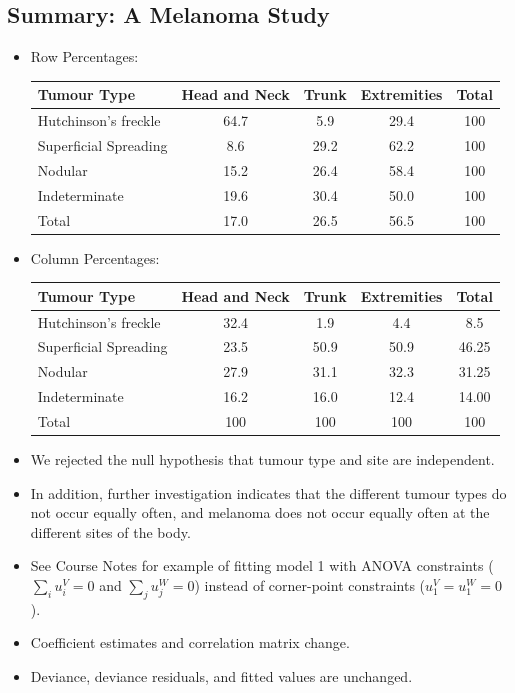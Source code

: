 \documentclass{article}\usepackage[]{graphicx}\usepackage[svgnames]{xcolor}
\begin{document}
\subsection*{Summary: A Melanoma Study}
\begin{itemize}
    \item Row Percentages:
          \begin{table}[H]
              \centering
              \begin{tabular}{lcccc}
                  Tumour Type           & Head and Neck & Trunk & Extremities & Total \\
                  \midrule
                  Hutchinson's freckle  & 64.7          & 5.9   & 29.4        & 100   \\
                  Superficial Spreading & 8.6           & 29.2  & 62.2        & 100   \\
                  Nodular               & 15.2          & 26.4  & 58.4        & 100   \\
                  Indeterminate         & 19.6          & 30.4  & 50.0        & 100   \\
                  Total                 & 17.0          & 26.5  & 56.5        & 100
              \end{tabular}
          \end{table}
    \item Column Percentages:
          \begin{table}[H]
              \centering
              \begin{tabular}{lcccc}
                  Tumour Type           & Head and Neck & Trunk & Extremities & Total \\
                  \midrule
                  Hutchinson's freckle  & 32.4          & 1.9   & 4.4         & 8.5   \\
                  Superficial Spreading & 23.5          & 50.9  & 50.9        & 46.25 \\
                  Nodular               & 27.9          & 31.1  & 32.3        & 31.25 \\
                  Indeterminate         & 16.2          & 16.0  & 12.4        & 14.00 \\
                  Total                 & 100           & 100   & 100         & 100
              \end{tabular}
          \end{table}
    \item We rejected the null hypothesis that tumour type and site are independent.
    \item In addition, further investigation indicates that the different tumour types do not
          occur equally often, and melanoma does not occur equally often at the different
          sites of the body.
    \item See Course Notes for example of fitting model 1 with ANOVA constraints
          ($ \sum_i u_i^V=0 $ and $ \sum_j u_j^W =0$) instead of corner-point constraints ($ u_1^V=u_1^W=0 $).
    \item Coefficient estimates and correlation matrix change.
    \item Deviance, deviance residuals, and fitted values are unchanged.
\end{itemize}
\end{document}
